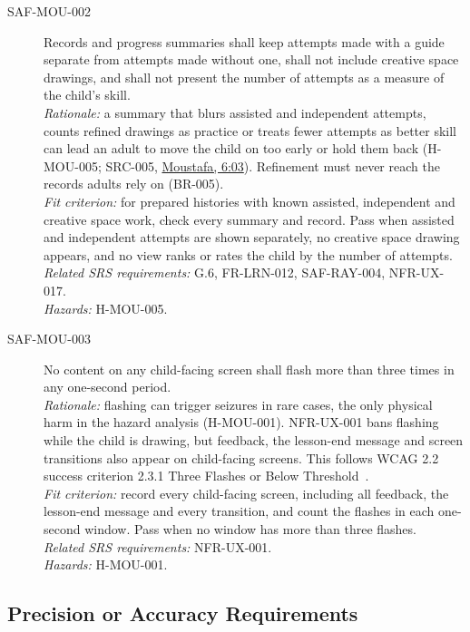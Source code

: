 \documentclass[12pt]{article}
\renewcommand{\_}{\textunderscore\allowbreak}%
\newcommand{\intlink}[3]{\hyperref[int:#1-#2]{#3}}
\newcommand{\intref}[2]{\intlink{#1}{#2}{#1, #2}}
\begin{document}
\begin{description}
\item[SAF-MOU-002] Records and progress summaries shall keep attempts made with
a guide separate from attempts made without one, shall not include creative
space drawings, and shall not present the number of attempts as a measure of the
child's skill.\\
\emph{Rationale:} a summary that blurs assisted and independent attempts, counts
refined drawings as practice or treats fewer attempts as better skill can lead
an adult to move the child on too early or hold them back (H-MOU-005; SRC-005,
\intref{Moustafa}{6:03}). Refinement must never reach the records adults rely on
(BR-005).\\
\emph{Fit criterion:} for prepared histories with known assisted, independent
and creative space work, check every summary and record. Pass when assisted and
independent attempts are shown separately, no creative space drawing appears,
and no view ranks or rates the child by the number of attempts.\\
\emph{Related SRS requirements:} G.6, FR-LRN-012, SAF-RAY-004, NFR-UX-017.\\
\emph{Hazards:} H-MOU-005.

\item[SAF-MOU-003]\label{req:SAF-MOU-003} No content on any
child-facing screen shall flash more than three times in any one-second
period.\\
\emph{Rationale:} flashing can trigger seizures in rare cases, the only physical
harm in the hazard analysis (H-MOU-001). NFR-UX-001 bans flashing while the
child is drawing, but feedback, the lesson-end message and screen transitions
also appear on child-facing screens. This follows WCAG 2.2 success criterion
2.3.1 Three Flashes or Below Threshold~\cite{wcag22}.\\
\emph{Fit criterion:} record every child-facing screen, including all feedback,
the lesson-end message and every transition, and count the flashes in each
one-second window. Pass when no window has more than three flashes.\\
\emph{Related SRS requirements:} NFR-UX-001.\\
\emph{Hazards:} H-MOU-001.

\end{description}
\subsection{Precision or Accuracy Requirements}
\end{document}
